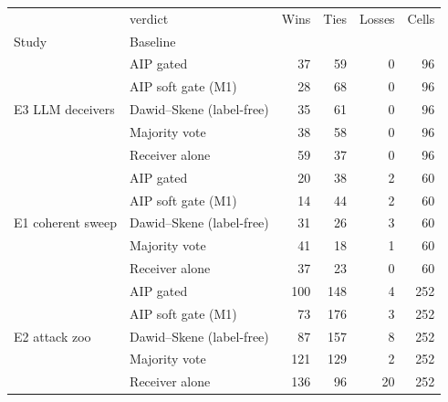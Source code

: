 \begin{tabular}{llrrrr}
\toprule
 & verdict & Wins & Ties & Losses & Cells \\
Study & Baseline &  &  &  &  \\
\midrule
\multirow[t]{5}{*}{E3 LLM deceivers} & AIP gated & 37 & 59 & 0 & 96 \\
 & AIP soft gate (M1) & 28 & 68 & 0 & 96 \\
 & Dawid–Skene (label-free) & 35 & 61 & 0 & 96 \\
 & Majority vote & 38 & 58 & 0 & 96 \\
 & Receiver alone & 59 & 37 & 0 & 96 \\
\cline{1-6}
\multirow[t]{5}{*}{E1 coherent sweep} & AIP gated & 20 & 38 & 2 & 60 \\
 & AIP soft gate (M1) & 14 & 44 & 2 & 60 \\
 & Dawid–Skene (label-free) & 31 & 26 & 3 & 60 \\
 & Majority vote & 41 & 18 & 1 & 60 \\
 & Receiver alone & 37 & 23 & 0 & 60 \\
\cline{1-6}
\multirow[t]{5}{*}{E2 attack zoo} & AIP gated & 100 & 148 & 4 & 252 \\
 & AIP soft gate (M1) & 73 & 176 & 3 & 252 \\
 & Dawid–Skene (label-free) & 87 & 157 & 8 & 252 \\
 & Majority vote & 121 & 129 & 2 & 252 \\
 & Receiver alone & 136 & 96 & 20 & 252 \\
\cline{1-6}
\bottomrule
\end{tabular}
